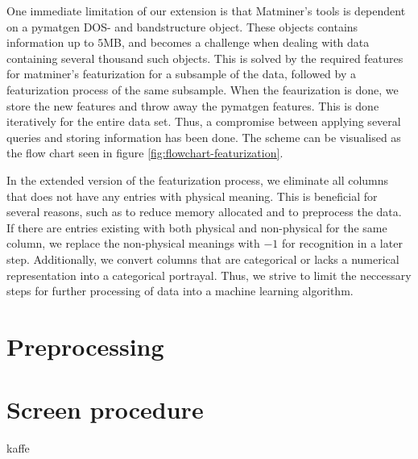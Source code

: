 One immediate limitation of our extension is that Matminer's tools is dependent on a pymatgen DOS- and bandstructure object. These objects contains information up to $5$MB, and becomes a challenge when dealing with data containing several thousand such objects. This is solved by the required features for matminer's featurization for a subsample of the data, followed by a featurization process of the same subsample. When the feaurization is done, we store the new features and throw away the pymatgen features. This is done iteratively for the entire data set. Thus, a compromise between applying several queries and storing information has been done. The scheme can be visualised as the flow chart seen in figure \ref{fig:flowchart-featurization}.

In the extended version of the featurization process, we eliminate all columns that does not have any entries with physical meaning. This is beneficial for several reasons, such as to reduce memory allocated and to preprocess the data. If there are entries existing with both physical and non-physical for the same column, we replace the non-physical meanings with $-1$ for recognition in a later step. Additionally, we convert columns that are categorical or lacks a numerical representation into a categorical portrayal. Thus, we strive to limit the neccessary steps for further processing of data into a machine learning algorithm.

\section{Preprocessing}



\section{Screen procedure}
kaffe
